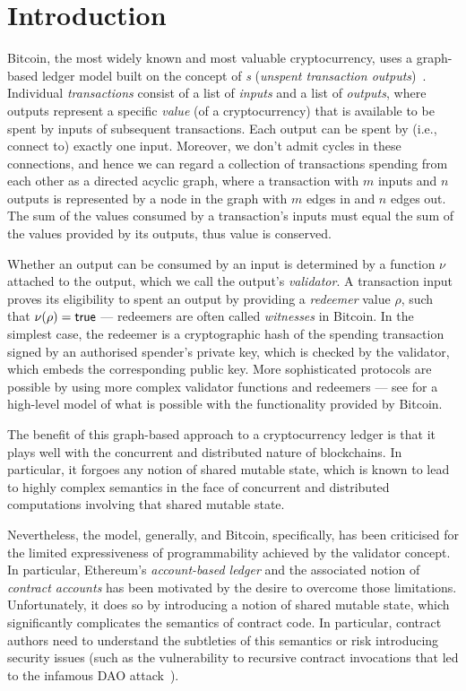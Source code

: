 \section{Introduction}

Bitcoin, the most widely known and most valuable cryptocurrency, uses
a graph-based ledger model built on the concept of \emph{\UTXO{}s} (\emph{unspent
  transaction outputs})~\cite{formal-model-of-bitcoin-transactions,Zahnentferner18-UTxO}. Individual \emph{transactions} consist of a list of \emph{inputs} and a list of \emph{outputs}, where outputs represent a specific \emph{value} (of a cryptocurrency) that is available to be spent by inputs of subsequent transactions. Each output can be spent by (i.e., connect to) exactly one input. Moreover, we don't admit cycles in these connections, and hence we can regard a collection of transactions spending from each other as a directed acyclic graph, where a transaction with $m$ inputs and $n$ outputs is represented by a node in the graph with $m$ edges in and $n$ edges out.
The sum of the values consumed by a transaction's inputs must equal the sum of the values provided by its outputs, thus value is conserved.

Whether an output can be consumed by an input is determined by a function $\nu$ attached to the output, which we call the output's \emph{validator}. A transaction input proves its eligibility to spent an output by providing a \emph{redeemer} value $\rho$, such that \(\nu(\rho) = \textsf{true}\) --- redeemers are often called \emph{witnesses} in Bitcoin. In the simplest case, the redeemer is a cryptographic hash of the spending transaction signed by an authorised spender's private key, which is checked by the validator, which embeds the corresponding public key. More sophisticated protocols are possible by using more complex validator functions and redeemers --- see \cite{bitml} for a high-level model of what is possible with the functionality provided by Bitcoin.

The benefit of this graph-based approach to a cryptocurrency ledger is that it plays well with the concurrent and distributed nature of blockchains. In particular, it forgoes any notion of shared mutable state, which is known to lead to highly complex semantics in the face of concurrent and distributed computations involving that shared mutable state.

Nevertheless, the \UTXO{} model, generally, and Bitcoin, specifically, has been criticised for the limited expressiveness of programmability achieved by the validator concept. In particular, Ethereum's \emph{account-based ledger} and the associated notion of \emph{contract accounts} has been motivated by the desire to overcome those limitations. Unfortunately, it does so by introducing a notion of shared mutable state, which significantly complicates the semantics of contract code. In particular, contract authors need to understand the subtleties of this semantics or risk introducing security issues (such as the vulnerability to recursive contract invocations that led to the infamous DAO attack~\cite{DAO-attack}).

